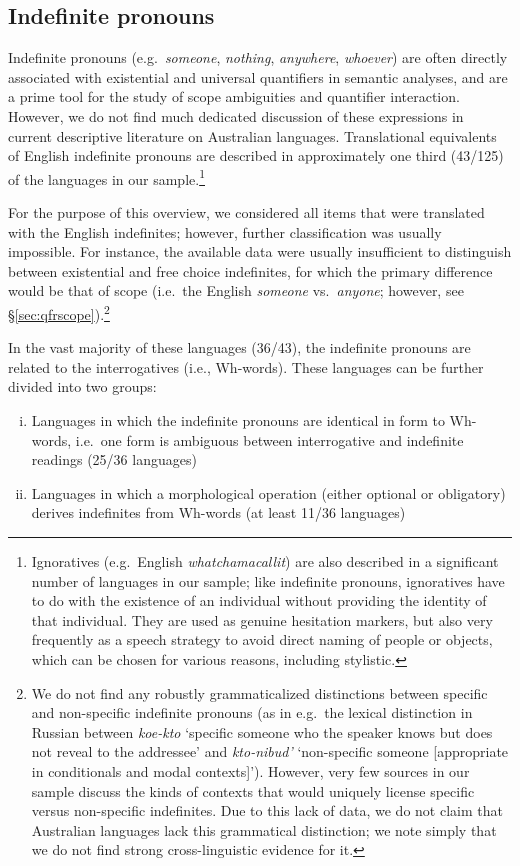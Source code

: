 \documentclass[12pt,egregdoesnotlikesansseriftitles]{scrartcl}
\newcommand{\ofy}{/125} %
\begin{document}
\subsection{Indefinite pronouns}
\label{sec:indefs}
Indefinite pronouns (e.g.\ \textit{someone}, \textit{nothing}, \textit{anywhere}, \textit{whoever}) are often directly associated with existential and universal quantifiers in semantic analyses, and are a prime tool for the study of scope ambiguities and quantifier interaction. However, we do not find much dedicated discussion of these expressions in current descriptive literature on Australian languages. Translational equivalents of English indefinite pronouns  are described in approximately one third (43\ofy) of the languages in our sample.\footnote{Ignoratives (e.g.\ English \textit{whatchamacallit}) are also described in a significant number of languages in our sample; like indefinite pronouns, ignoratives have to do with the existence of an individual without providing the identity of that individual. They are used as genuine hesitation markers, but also very frequently as a speech strategy to avoid direct naming of people or objects, which can be chosen for various reasons, including stylistic.}

For the purpose of this overview, we considered all items that were translated with the English indefinites; however, further classification was usually impossible. For instance, the available data were usually insufficient to distinguish between existential and free choice indefinites, for which the primary difference would be that of scope (i.e.\ the English \textit{someone} vs.\ \textit{anyone}; however, see \S\ref{sec:qfrscope}).\footnote{We do not find any robustly grammaticalized distinctions between specific and non-specific indefinite pronouns (as in e.g.\ the lexical distinction in Russian between \textit{koe-kto} `specific someone who the speaker knows but does not reveal to the addressee' and \textit{kto-nibud'} `non-specific someone [appropriate in conditionals and modal contexts]'). However, very few sources in our sample discuss the kinds of contexts that would uniquely license specific versus non-specific indefinites. Due to this lack of data, we do not claim that Australian languages lack this grammatical distinction; we note simply that we do not find strong cross-linguistic evidence for it.}

In the vast majority of these languages (36/43), the indefinite pronouns are related to the interrogatives (i.e., Wh-words). These languages can be further divided into two groups:
\begin{enumerate}[(i)]
\item Languages in which the indefinite pronouns are identical in form to Wh-words, i.e.\ one form is ambiguous between interrogative and indefinite readings (25/36 languages) %
\item Languages in which a morphological operation (either optional or obligatory) derives indefinites from Wh-words (at least 11/36 languages)
\end{enumerate}
\end{document}
